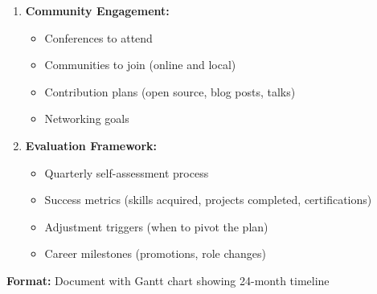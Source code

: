 \begin{exercise}
\begin{enumerate}
    \item \textbf{Community Engagement:}
    \begin{itemize}
        \item Conferences to attend
        \item Communities to join (online and local)
        \item Contribution plans (open source, blog posts, talks)
        \item Networking goals
    \end{itemize}

    \item \textbf{Evaluation Framework:}
    \begin{itemize}
        \item Quarterly self-assessment process
        \item Success metrics (skills acquired, projects completed, certifications)
        \item Adjustment triggers (when to pivot the plan)
        \item Career milestones (promotions, role changes)
    \end{itemize}
\end{enumerate}

\textbf{Format:} Document with Gantt chart showing 24-month timeline
\end{exercise}
